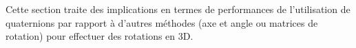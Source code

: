 Cette section traite des implications en termes de performances de l'utilisation de
quaternions par rapport à d'autres méthodes (axe et angle ou matrices de rotation) 
pour effectuer des rotations en 3D.

\clearpage 